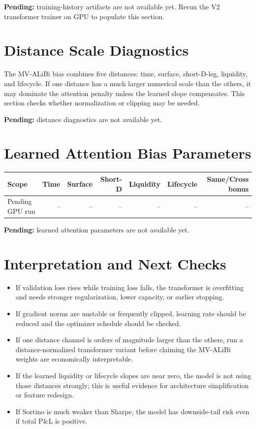\documentclass[11pt]{article}
\begin{document}
\textbf{Pending:} training-history artifacts are not available yet. Rerun the V2 transformer trainer on GPU to populate this section.

\section{Distance Scale Diagnostics}
The MV-ALiBi bias combines five distances: time, surface, short-D-leg, liquidity, and lifecycle. If one distance has a much larger numerical scale than the others, it may dominate the attention penalty unless the learned slope compensates. This section checks whether normalization or clipping may be needed.

\textbf{Pending:} distance diagnostics are not available yet.

\section{Learned Attention Bias Parameters}
\begin{table}[H]
\centering
\small
\begin{tabular}{lrrrrrr}
\toprule
Scope & Time & Surface & Short-D & Liquidity & Lifecycle & Same/Cross bonus \\
\midrule
Pending GPU run & -- & -- & -- & -- & -- & -- \\
\bottomrule
\end{tabular}
\end{table}

\textbf{Pending:} learned attention parameters are not available yet.

\section{Interpretation and Next Checks}
\begin{itemize}
  \item If validation loss rises while training loss falls, the transformer is overfitting and needs stronger regularization, lower capacity, or earlier stopping.
  \item If gradient norms are unstable or frequently clipped, learning rate should be reduced and the optimizer schedule should be checked.
  \item If one distance channel is orders of magnitude larger than the others, run a distance-normalized transformer variant before claiming the MV-ALiBi weights are economically interpretable.
  \item If the learned liquidity or lifecycle slopes are near zero, the model is not using those distances strongly; this is useful evidence for architecture simplification or feature redesign.
  \item If Sortino is much weaker than Sharpe, the model has downside-tail risk even if total P\&L is positive.
\end{itemize}
\end{document}
